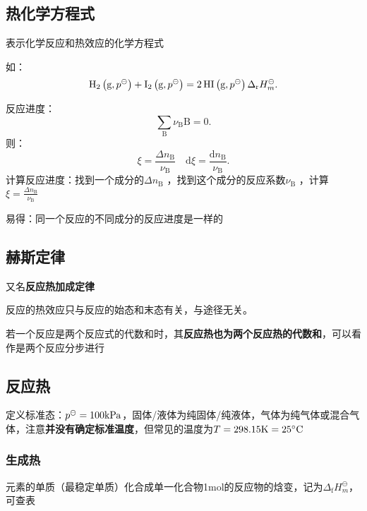 \subsection{热化学方程式}%
\label{sub:热化学方程式}
\begin{defi}
    表示化学反应和热效应的化学方程式
\end{defi}
如：\[
    \ce{H_2}\left( \text{g},p^\ominus \right) + \ce{I_2}\left( \text{g},p^\ominus \right) = \ce{2HI}\left( \text{g},p^\ominus \right) \Delta_\text{r}H_{m}^\ominus
.\]
\begin{notation}
    反应进度：\[
        \sum_{\text{B}} \nu_\text{B}\text{B} = 0
    .\]
    则：\[
        \xi = \frac{\Delta n_\text{B}}{\nu_\text{B}} \quad \mathrm{d}\xi = \frac{\mathrm{d}n_\text{B}}{\nu_\text{B}}
    .\]
    计算反应进度：找到一个成分的$\Delta n_\text{B}$ ，找到这个成分的反应系数$\nu_\text{B}$ ，计算$\xi = \frac{\Delta n_\text{B}}{\nu_\text{B}}$
\end{notation}
易得：同一个反应的不同成分的反应进度是一样的
\subsection{赫斯定律}%
\label{sub:赫斯定律}
又名\textbf{反应热加成定律} 
\begin{defi}
    反应的热效应只与反应的始态和末态有关，与途径无关。
\end{defi}
若一个反应是两个反应式的代数和时，其\textbf{反应热也为两个反应热的代数和}，可以看作是两个反应分步进行
\subsection{反应热}%
\label{sub:反应热}
定义标准态：$p^\ominus=100\ce{kPa}$，固体/液体为纯固体/纯液体，气体为纯气体或混合气体，注意\textbf{并没有确定标准温度}，但常见的温度为$T=298.15\ce{K}=25^\circ\text{C}$
\subsubsection*{生成热}%
\label{subsub*:生成热}
元素的单质（最稳定单质）化合成单一化合物1mol的反应物的焓变，记为$\Delta_\text{f}H_{m}^\ominus $，可查表

